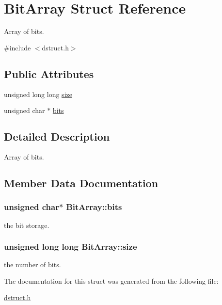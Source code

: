 \hypertarget{structBitArray}{}\section{Bit\+Array Struct Reference}
\label{structBitArray}


Array of bits.  




{\ttfamily \#include $<$dstruct.\+h$>$}

\subsection*{Public Attributes}
\begin{DoxyCompactItemize}
\item 
unsigned long long \hyperlink{structBitArray_ac22cc26395f8a292d18ea0dff63ab3d4}{size}
\item 
unsigned char $\ast$ \hyperlink{structBitArray_a4c3ccabadad2f8371b7b12f7396d01bf}{bits}
\end{DoxyCompactItemize}


\subsection{Detailed Description}
Array of bits. 

\subsection{Member Data Documentation}
\subsubsection[{\texorpdfstring{bits}{bits}}]{\setlength{\rightskip}{0pt plus 5cm}unsigned char$\ast$ Bit\+Array\+::bits}\hypertarget{structBitArray_a4c3ccabadad2f8371b7b12f7396d01bf}{}\label{structBitArray_a4c3ccabadad2f8371b7b12f7396d01bf}
the bit storage. 
\subsubsection[{\texorpdfstring{size}{size}}]{\setlength{\rightskip}{0pt plus 5cm}unsigned long long Bit\+Array\+::size}\hypertarget{structBitArray_ac22cc26395f8a292d18ea0dff63ab3d4}{}\label{structBitArray_ac22cc26395f8a292d18ea0dff63ab3d4}
the number of bits. 

The documentation for this struct was generated from the following file\+:\begin{DoxyCompactItemize}
\item 
\hyperlink{dstruct_8h}{dstruct.\+h}\end{DoxyCompactItemize}
